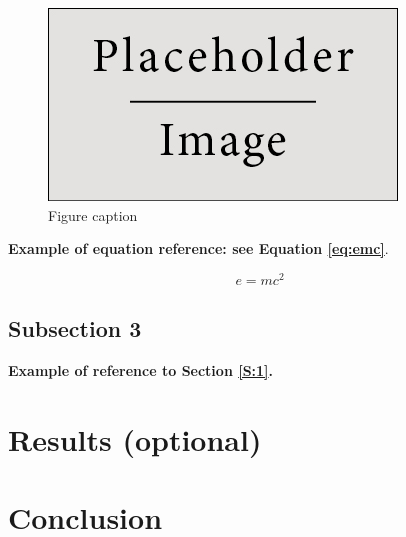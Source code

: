 \documentclass{article}
\begin{document}
  \begin{figure}[ht]
  \centering\includegraphics[width=0.4\linewidth]{figures/placeholder.jpg}
  \caption{Figure caption}
  \label{fig:example}
  \end{figure}
  
  \textbf{Example of equation reference: see Equation \eqref{eq:emc}}. 
  \lipsum[6]
  
  \begin{equation} 
  \label{eq:emc}
  e = mc^2
  \end{equation}
  
  \subsection{Subsection 3}
  
  \textbf{Example of reference to Section \ref{S:1}.} 
  \lipsum[7]
  \lipsum[8]
  
  
  
  \section{Results (optional)}
  
  \lipsum[9]
  
  \section{Conclusion}
  
  \lipsum[10]
  
  {}
  
  
  
\end{document}
